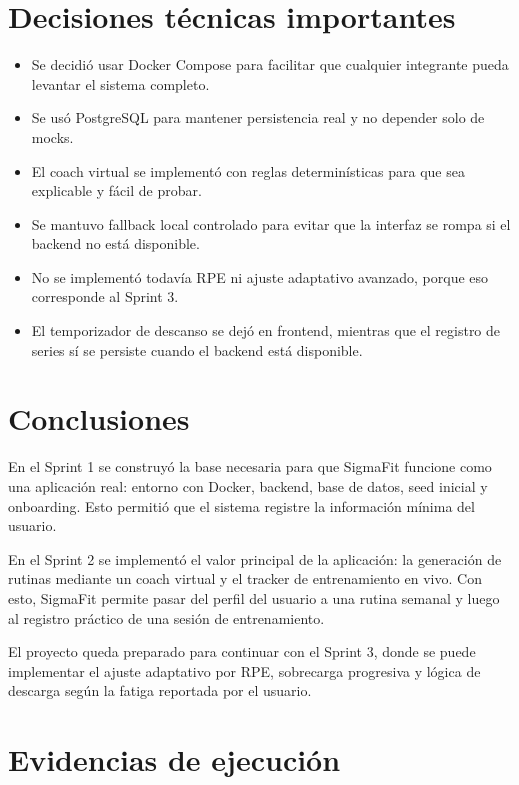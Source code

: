 \documentclass[12pt,a4paper]{article}
\begin{document}
\section{Decisiones técnicas importantes}

\begin{itemize}
    \item Se decidió usar Docker Compose para facilitar que cualquier integrante pueda levantar el sistema completo.
    \item Se usó PostgreSQL para mantener persistencia real y no depender solo de mocks.
    \item El coach virtual se implementó con reglas determinísticas para que sea explicable y fácil de probar.
    \item Se mantuvo fallback local controlado para evitar que la interfaz se rompa si el backend no está disponible.
    \item No se implementó todavía RPE ni ajuste adaptativo avanzado, porque eso corresponde al Sprint 3.
    \item El temporizador de descanso se dejó en frontend, mientras que el registro de series sí se persiste cuando el backend está disponible.
\end{itemize}

\section{Conclusiones}

En el Sprint 1 se construyó la base necesaria para que SigmaFit funcione como una aplicación real: entorno con Docker, backend, base de datos, seed inicial y onboarding. Esto permitió que el sistema registre la información mínima del usuario.

En el Sprint 2 se implementó el valor principal de la aplicación: la generación de rutinas mediante un coach virtual y el tracker de entrenamiento en vivo. Con esto, SigmaFit permite pasar del perfil del usuario a una rutina semanal y luego al registro práctico de una sesión de entrenamiento.

El proyecto queda preparado para continuar con el Sprint 3, donde se puede implementar el ajuste adaptativo por RPE, sobrecarga progresiva y lógica de descarga según la fatiga reportada por el usuario.

\newpage
\section{Evidencias de ejecución}
\end{document}
